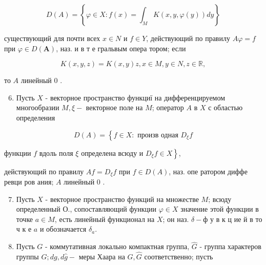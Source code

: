 \documentclass[10pt]{article}
\begin{document}
\[

D(A)=\left\{\varphi \in X: f(x)=\int_{M} K(x, y, \varphi(y)) d y\right\}

\]



существующий для почти всех $x \in N$ и $f \in Y$, действующий по правилу $A \varphi=f$ при $\varphi \in D(\boldsymbol{A})$, наз. и в т е гральвым опера тором; если



\[

K(x, y, z)=K(x, y) z, x \in M, y \in N, z \in \mathbb{R},

\]



то $A$ линейный 0 .



\begin{enumerate}

  \setcounter{enumi}{5}

  \item Пусть $X$ - векторное пространство функциї на дифференцируемом многообразии $M, \xi-$ векторное поле на $M$; оператор $A$ в $X$ с областью определения

\end{enumerate}



\[

D(A)=\left\{f \in X: \text { произв одная } D_{\xi} f\right.

\]



функции $f$ вдоль поля $\xi$ определена всюду и $\left.D_{\xi} f \in X\right\}$,



действующий по правилу $A f=D_{\xi} f$ при $f \in D(A)$, наз. опе ратором диффе ревци ров ания; $A$ линейный 0 .



\begin{enumerate}

  \setcounter{enumi}{6}

  \item Пусть $X$ - векторное пространство функций на множестве $M$; всюду определенный О., сопоставляющий функции $\varphi \in X$ значение этой функции в точке $a \in M$, есть линейный функционал на $X$; он наз. $\delta-ф$ у в к ц ие й в то ч к е $a$ и обозначается $\delta_{a}$.



  \item Пусть $G$ - коммутативная локально компактная группа, $\hat{G}$ - группа характеров группы $G ; d g, d \hat{g}-$ меры Хаара на $G, \widehat{G}$ соответственно; пусть



\end{enumerate}
\end{document}
